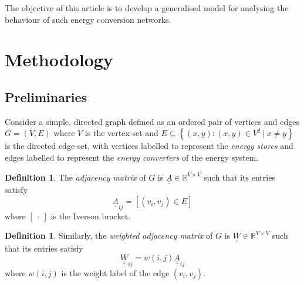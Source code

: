 \documentclass[]{article}
\def \mat#1{\underline{\underline{#1}}}
\numberwithin{equation}{section}
\theoremstyle{plain} %
\theoremstyle{definition}
\newtheorem{defn}[equation]{Definition}
\theoremstyle{remark}
\begin{document}
The objective of this article is to develop a generalised model for analysing the behaviour of such energy conversion networks.

\section{Methodology}
\subsection{Preliminaries}
Consider a simple, directed graph defined as an ordered pair of vertices and edges $G = (V, E)$
where $V$ is the vertex-set and $E\subseteq\left \{(x,y):(x,y)\in V^2\ |\ x\neq y\right \}$ is the directed edge-set, with vertices labelled to represent the \emph{energy stores}
and edges labelled to represent the \emph{energy converters} of the energy system.
\begin{defn}
    The \emph{adjacency matrix} of $G$ is $\mat A\in\mathbb{R}^{V\times V}$ such that its entries satisfy
    $$\mat A_{ij} = \left [(v_i, v_j)\in E \right ]$$
    where $[\ \cdot\ ]$ is the Iverson bracket.
\end{defn}
\begin{defn}
    Similarly, the \emph{weighted adjacency matrix} of $G$ is $\mat W\in\mathbb{R}^{V\times V}$ such that its entries satisfy
    $$\mat W_{ij} = w(i, j)\mat A_{ij}$$
    where $w(i, j)$ is the weight label of the edge $(v_i, v_j)$.
\end{defn}
\end{document}
